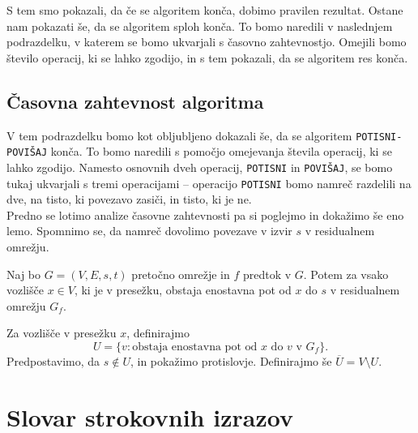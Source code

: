 \documentclass[mat1]{fmfdelo}
\begin{document}
S tem smo pokazali, da če se algoritem konča, dobimo pravilen rezultat. Ostane nam pokazati še, da se algoritem sploh konča. To bomo naredili v naslednjem podrazdelku, v katerem se bomo ukvarjali s časovno zahtevnostjo. Omejili bomo število operacij, ki se lahko zgodijo, in s tem pokazali, da se algoritem res konča.\\

\subsection{Časovna zahtevnost algoritma}

V tem podrazdelku bomo kot obljubljeno dokazali še, da se algoritem \texttt{POTISNI-POVIŠAJ} konča. To bomo naredili s pomočjo omejevanja števila operacij, ki se lahko zgodijo. Namesto osnovnih dveh operacij, \texttt{POTISNI} in \texttt{POVIŠAJ}, se bomo tukaj ukvarjali s tremi operacijami -- operacijo \texttt{POTISNI} bomo namreč razdelili na dve, na tisto, ki povezavo zasiči, in tisto, ki je ne.\\

Predno se lotimo analize časovne zahtevnosti pa si poglejmo in dokažimo še eno lemo. Spomnimo se, da namreč dovolimo povezave v izvir $s$ v residualnem omrežju.\\

\begin{lema}
Naj bo $G=(V,E,s,t)$ pretočno omrežje in $f$ predtok v $G$. Potem za vsako vozlišče $x\in V$, ki je v presežku, obstaja enostavna pot od $x$ do $s$ v residualnem omrežju $G_f$.
\end{lema}

\begin{dokaz}
Za vozlišče v presežku $x$, definirajmo \[U = \{v : \textrm{obstaja enostavna pot od $x$ do $v$ v $G_f$}\}.\] Predpostavimo, da $s \notin U$, in pokažimo protislovje. Definirajmo še $\overline{U} = V \setminus U$.
\end{dokaz}



























\newpage


\section*{Slovar strokovnih izrazov}

\geslo{}{}
\geslo{}{}


\begin{thebibliography}{99}


\end{thebibliography}
\end{document}
